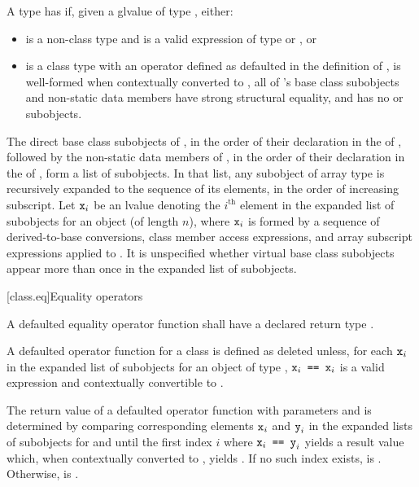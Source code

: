 \pnum
{}%
A type  has  if,
given a glvalue  of type , either:
\begin{itemize}
\item
   is a non-class type and  is a valid expression
  of type  or , or
\item
   is a class type with an \tcode{==} operator
  defined as defaulted in the definition of ,
   is well-formed when contextually converted to ,
  all of 's base class subobjects and non-static data members
  have strong structural equality, and
   has no  or  subobjects.
\end{itemize}

\pnum
The direct base class subobjects of ,
in the order of their declaration in the  of ,
followed by the non-static data members of ,
in the order of their declaration in the  of ,
form a list of subobjects.
In that list, any subobject of array type is recursively expanded
to the sequence of its elements, in the order of increasing subscript.
Let $\texttt{x}_i$ be an lvalue denoting the $i^\text{th}$ element
in the expanded list of subobjects for an object 
(of length $n$),
where $\texttt{x}_i$ is
formed by a sequence of
derived-to-base conversions,
class member access expressions, and
array subscript expressions applied to .
It is unspecified whether virtual base class subobjects
appear more than once in the expanded list of subobjects.

[class.eq]{Equality operators}
%
%

\pnum
A defaulted equality operator function
shall have a declared return type .

\pnum
A defaulted \tcode{==} operator function for a class 
is defined as deleted
unless, for each $\texttt{x}_i$ in the expanded list of subobjects
for an object  of type ,
$\texttt{x}_i\texttt{ == }\texttt{x}_i$ is a valid expression and
contextually convertible to .

\pnum
The return value  of a defaulted \tcode{==} operator function
with parameters  and  is determined
by comparing corresponding elements $\texttt{x}_i$ and $\texttt{y}_i$
in the expanded lists of subobjects for  and 
until the first index $i$
where $\texttt{x}_i\texttt{ == }\texttt{y}_i$ yields a result value which,
when contextually converted to , yields .
If no such index exists,  is .
Otherwise,  is .

